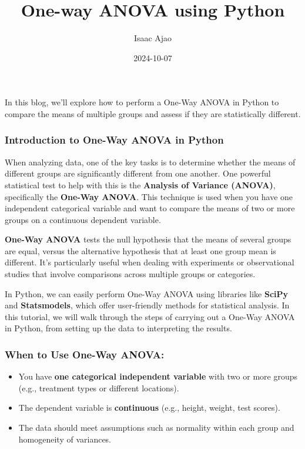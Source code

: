 \documentclass[
  letterpaper,
  DIV=11,
  numbers=noendperiod]{scrartcl}
\title{One-way ANOVA using Python}
\author{Isaac Ajao}
\date{2024-10-07}
\begin{document}
\maketitle
\ifdefined\Shaded\renewenvironment{Shaded}{\begin{tcolorbox}[breakable, boxrule=0pt, sharp corners, interior hidden, borderline west={3pt}{0pt}{shadecolor}, enhanced, frame hidden]}{\end{tcolorbox}}\fi

In this blog, we'll explore how to perform a One-Way ANOVA in Python to
compare the means of multiple groups and assess if they are
statistically different.

\hypertarget{introduction-to-one-way-anova-in-python}{%
\subsubsection{Introduction to One-Way ANOVA in
Python}\label{introduction-to-one-way-anova-in-python}}

When analyzing data, one of the key tasks is to determine whether the
means of different groups are significantly different from one another.
One powerful statistical test to help with this is the \textbf{Analysis
of Variance (ANOVA)}, specifically the \textbf{One-Way ANOVA}. This
technique is used when you have one independent categorical variable and
want to compare the means of two or more groups on a continuous
dependent variable.

\textbf{One-Way ANOVA} tests the null hypothesis that the means of
several groups are equal, versus the alternative hypothesis that at
least one group mean is different. It's particularly useful when dealing
with experiments or observational studies that involve comparisons
across multiple groups or categories.

In Python, we can easily perform One-Way ANOVA using libraries like
\textbf{SciPy} and \textbf{Statsmodels}, which offer user-friendly
methods for statistical analysis. In this tutorial, we will walk through
the steps of carrying out a One-Way ANOVA in Python, from setting up the
data to interpreting the results.

\hypertarget{when-to-use-one-way-anova}{%
\subsubsection{When to Use One-Way
ANOVA:}\label{when-to-use-one-way-anova}}

\begin{itemize}
\item
  You have \textbf{one categorical independent variable} with two or
  more groups (e.g., treatment types or different locations).
\item
  The dependent variable is \textbf{continuous} (e.g., height, weight,
  test scores).
\item
  The data should meet assumptions such as normality within each group
  and homogeneity of variances.
\end{itemize}
\end{document}
